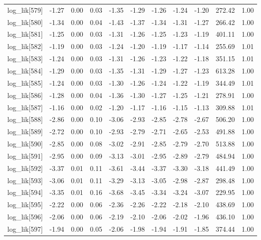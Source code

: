 \begin{table}[ht]
\begin{tabular}{rrrrrrrrrrr}
  log\_lik[579] & -1.27 & 0.00 & 0.03 & -1.35 & -1.29 & -1.26 & -1.24 & -1.20 & 272.42 & 1.00 \\ 
  log\_lik[580] & -1.34 & 0.00 & 0.04 & -1.43 & -1.37 & -1.34 & -1.31 & -1.27 & 266.42 & 1.00 \\ 
  log\_lik[581] & -1.25 & 0.00 & 0.03 & -1.31 & -1.26 & -1.25 & -1.23 & -1.19 & 401.11 & 1.00 \\ 
  log\_lik[582] & -1.19 & 0.00 & 0.03 & -1.24 & -1.20 & -1.19 & -1.17 & -1.14 & 255.69 & 1.01 \\ 
  log\_lik[583] & -1.24 & 0.00 & 0.03 & -1.31 & -1.26 & -1.23 & -1.22 & -1.18 & 351.15 & 1.01 \\ 
  log\_lik[584] & -1.29 & 0.00 & 0.03 & -1.35 & -1.31 & -1.29 & -1.27 & -1.23 & 613.28 & 1.00 \\ 
  log\_lik[585] & -1.24 & 0.00 & 0.03 & -1.30 & -1.26 & -1.24 & -1.22 & -1.19 & 344.49 & 1.01 \\ 
  log\_lik[586] & -1.28 & 0.00 & 0.04 & -1.36 & -1.30 & -1.27 & -1.25 & -1.21 & 278.91 & 1.00 \\ 
  log\_lik[587] & -1.16 & 0.00 & 0.02 & -1.20 & -1.17 & -1.16 & -1.15 & -1.13 & 309.88 & 1.01 \\ 
  log\_lik[588] & -2.86 & 0.00 & 0.10 & -3.06 & -2.93 & -2.85 & -2.78 & -2.67 & 506.20 & 1.00 \\ 
  log\_lik[589] & -2.72 & 0.00 & 0.10 & -2.93 & -2.79 & -2.71 & -2.65 & -2.53 & 491.88 & 1.00 \\ 
  log\_lik[590] & -2.85 & 0.00 & 0.08 & -3.02 & -2.91 & -2.85 & -2.79 & -2.70 & 513.88 & 1.00 \\ 
  log\_lik[591] & -2.95 & 0.00 & 0.09 & -3.13 & -3.01 & -2.95 & -2.89 & -2.79 & 484.94 & 1.00 \\ 
  log\_lik[592] & -3.37 & 0.01 & 0.11 & -3.61 & -3.44 & -3.37 & -3.30 & -3.18 & 441.49 & 1.00 \\ 
  log\_lik[593] & -3.06 & 0.01 & 0.11 & -3.29 & -3.13 & -3.05 & -2.98 & -2.87 & 298.48 & 1.00 \\ 
  log\_lik[594] & -3.35 & 0.01 & 0.16 & -3.68 & -3.45 & -3.34 & -3.24 & -3.07 & 229.95 & 1.00 \\ 
  log\_lik[595] & -2.22 & 0.00 & 0.06 & -2.36 & -2.26 & -2.22 & -2.18 & -2.10 & 438.69 & 1.00 \\ 
  log\_lik[596] & -2.06 & 0.00 & 0.06 & -2.19 & -2.10 & -2.06 & -2.02 & -1.96 & 436.10 & 1.00 \\ 
  log\_lik[597] & -1.94 & 0.00 & 0.05 & -2.06 & -1.98 & -1.94 & -1.91 & -1.85 & 374.44 & 1.00 \\ 

\end{tabular}
\end{table}
